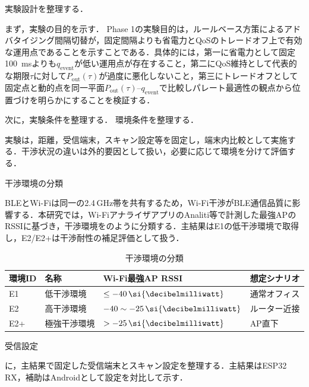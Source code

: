 ﻿%
実験設計を整理する．
\label{sec:experiment_design}

まず，実験の目的を示す．
Phase 1の実験目的は，ルールベース方策によるアドバタイジング間隔切替が，固定間隔よりも省電力とQoSのトレードオフ上で有効な運用点であることを示すことである．具体的には，第一に省電力として固定\SI{100}{\milli\second}よりも$q_{\mathrm{event}}$が低い運用点が存在すること，第二にQoS維持として代表的な期限$\tau$に対して$P_{\mathrm{out}}(\tau)$が過度に悪化しないこと，第三にトレードオフとして固定点と動的点を同一平面$P_{\mathrm{out}}(\tau)$--$q_{\mathrm{event}}$で比較しパレート最適性の観点から位置づけを明らかにすることを検証する．

次に，実験条件を整理する．
環境条件を整理する．

実験は，距離，受信端末，スキャン設定等を固定し，端末内比較として実施する．干渉状況の違いは外的要因として扱い，必要に応じて環境を分けて評価する．

干渉環境の分類\par
BLEとWi-Fiは同一の2.4\,GHz帯を共有するため，Wi-Fi干渉がBLE通信品質に影響する．本研究では，Wi-FiアナライザアプリのAnaliti等で計測した最強APのRSSIに基づき，干渉環境をのように分類する．主結果はE1の低干渉環境で取得し，E2/E2+は干渉耐性の補足評価として扱う．

\begin{table}[tb]
  \centering
  \caption{干渉環境の分類}
  \label{tab:env_interference}
  \begin{tabular}{llll}
    \toprule
    環境ID & 名称 & Wi-Fi最強AP RSSI & 想定シナリオ \\
    \midrule
    E1 & 低干渉環境 & $\le -40\,\si{\decibelmilliwatt}$ & 通常オフィス \\
    E2 & 高干渉環境 & $-40 \sim -25\,\si{\decibelmilliwatt}$ & ルーター近接 \\
    E2+ & 極強干渉環境 & $> -25\,\si{\decibelmilliwatt}$ & AP直下 \\
    \bottomrule
  \end{tabular}
\end{table}

受信設定\par
{}に，主結果で固定した受信端末とスキャン設定を整理する．主結果はESP32 RX，補助はAndroidとして設定を対比して示す．

